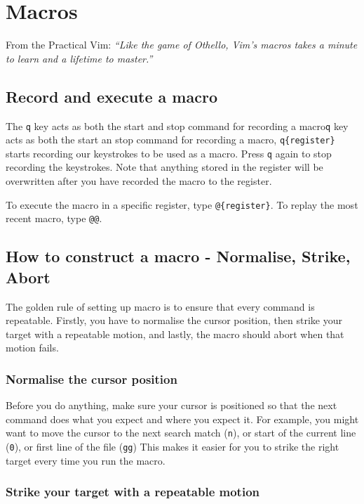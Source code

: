 \chapter{Macros}

From the Practical Vim: \textit{``Like the game of Othello, Vim's macros takes a minute to learn and a lifetime to master.''}

\section{Record and execute a macro}

The \verb|q| key acts as both the start and stop command for recording a macro\verb|q| key acts as both the start an stop command for recording a macro,
\verb|q{register}| starts recording our keystrokes to be used as a macro.
Press \verb|q| again to stop recording the keystrokes.
Note that anything stored in the register will be overwritten after you have recorded the macro to the register.

To execute the macro in a specific register, type \verb|@{register}|.
To replay the most recent macro, type \verb|@@|.

\section{How to construct a macro - Normalise, Strike, Abort}

The golden rule of setting up macro is to ensure that every command is repeatable.
Firstly, you have to normalise the cursor position, then strike your target with a repeatable motion, and lastly, the macro should abort when that motion fails.

\subsection{Normalise the cursor position}

Before you do anything, make sure your cursor is positioned so that the next command does what you expect and where you expect it.
For example, you might want to move the cursor to the next search match (\verb|n|), or start of the current line (\verb|0|), or first line of the file (\verb|gg|)
This makes it easier for you to strike the right target every  time you run the macro.

\subsection{Strike your target with a repeatable motion}

